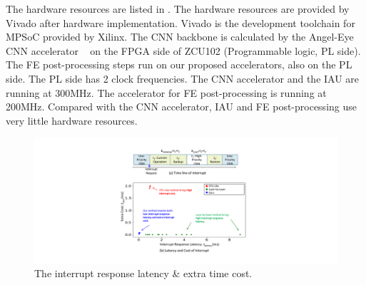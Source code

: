 The hardware resources are listed in . The hardware resources are provided by Vivado after hardware implementation. Vivado\cite{Vivado} is the development toolchain for MPSoC provided by Xilinx. The CNN backbone is calculated by the Angel-Eye CNN accelerator ~\cite{guo2017angel} on the FPGA side of ZCU102 (Programmable logic, PL side). The FE post-processing steps run on our proposed accelerators, also on the PL side. The PL side has 2 clock frequencies. The CNN accelerator and the IAU are running at 300MHz. The accelerator for FE post-processing is running at 200MHz. Compared with the CNN accelerator, IAU and FE post-processing use very little hardware resources.

  

\begin{figure}[t]
  \centering
  \includegraphics[width=0.99\linewidth]{fig/PRresult.pdf}
  \caption{The interrupt response latency \& extra time cost.}
  \label{fig:scatter1024}
\end{figure}



